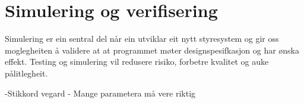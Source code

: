 \chapter{Simulering og verifisering}
\thispagestyle{fancy}

Simulering er ein sentral del når ein utviklar eit nytt styresystem
og gir oss moglegheiten å validere at at programmet møter designspesifkasjon og har ønska effekt.
Testing og simulering vil redusere risiko, forbetre kvalitet og auke pålitlegheit.

-Stikkord vegard
- Mange parametera må vere riktig
